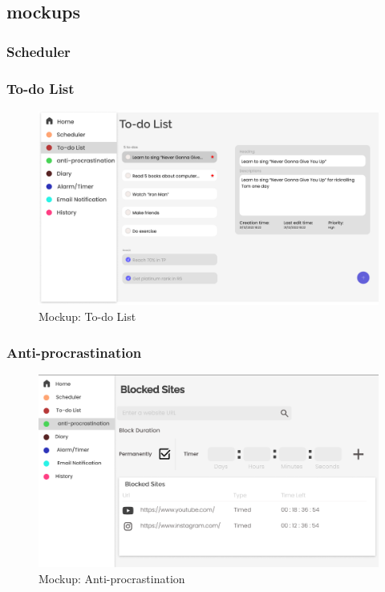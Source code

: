\documentclass[a4paper]{article}
\begin{document}
{\subsection{mockups}

\subsubsection{Scheduler}

\subsubsection{To-do List}

\begin{figure}[H] %
	\centering %
	\includegraphics[width=1\textwidth]{./images/Mockup_Todo_list.png} %
	\caption*{Mockup: To-do List} %
	\label{Fig.todolist} %
\end{figure}


\subsubsection{Anti-procrastination}

\begin{figure}[H] %
	\centering %
	\includegraphics[width=1\textwidth]{./images/Mockup_Anti-procrastination.png} %
	\caption*{Mockup: Anti-procrastination} %
	\label{Fig.Anti-procrastination} %
\end{figure}

}
\end{document}
